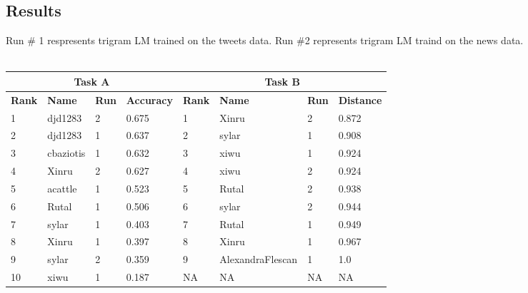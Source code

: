 \documentclass[a0,portrait]{a0poster}
\begin{document}
\begin{multicols}{2}
\color{Navy}

\section*{\LARGE Results}
Run \# 1 respresents trigram LM trained on the tweets data. Run \#2 represents trigram LM traind on the news data.\\\\
\begin{tabular}{l l l l | l l l l} 
\toprule
\multicolumn{4}{c}{Task A} & \multicolumn{4}{|c}{Task B}\\
\hline
\textbf{Rank} & \textbf{Name} & \textbf{Run} & \textbf{Accuracy} & \textbf{Rank} & \textbf{Name} & \textbf{Run} & \textbf{Distance}\\
\hline
1 & djd1283 & 2 & 0.675 & \color{Green} 1 & \color{Green} Xinru	& \color{Green} 2	& \color{Green} 0.872\\
2 & djd1283 & 1 & 0.637 & 2	& sylar	& 1	& 0.908\\
3 & cbaziotis & 1 & 0.632 & 3	& xiwu & 1 & 0.924\\
\color{Green} 4 & \color{Green} Xinru & \color{Green} 2 & \color{Green} 0.627 & 4 & xiwu	& 2 & 0.924\\
5 & acattle & 1 & 0.523 & 5	& Rutal & 2 & 0.938\\
6 & Rutal & 1 & 0.506 & 6 & sylar & 2 & 0.944\\
7 & sylar & 1 & 0.403 & 7 & Rutal & 1 & 0.949\\
\color{Green} 8 & \color{Green} Xinru & \color{Green} 1 & \color{Green} 0.397 & \color{Green}8 & \color{Green} Xinru & \color{Green} 1 & \color{Green} 0.967\\
9 & sylar & 2 & 0.359 & 9 & AlexandraFlescan & 1 & 1.0\\
10 & xiwu & 1 & 0.187 & NA & NA & NA & NA\\
\bottomrule
\end{tabular}


\color{SaddleBrown} %


\end{multicols}
\end{document}

